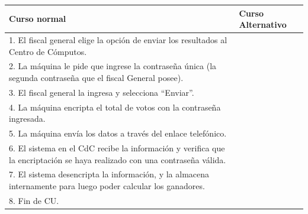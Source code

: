 \begin{table}[h!]
	
 \begin{tabular}{|p{7.5cm} | p{7.5cm}|} 
 \hline
 \textbf{Curso normal} & \textbf{Curso Alternativo} \\
 \hline

1. El fiscal general elige la opción de enviar los resultados al Centro de Cómputos.  & \\
\hline

2. La máquina le pide que ingrese la contraseña única (la segunda contraseña que el fiscal General posee). & \\
\hline

3. El fiscal general la ingresa y selecciona “Enviar”. & \\
\hline

4. La máquina encripta el total de votos con la contraseña ingresada. & \\
\hline

5. La máquina envía los datos a través del enlace telefónico. & \\
\hline

6. El sistema en el CdC recibe la información y verifica que la encriptación se haya realizado con una contraseña válida. & \\
\hline

7. El sistema desencripta la información, y la almacena internamente para luego poder calcular los ganadores. & \\

\hline

8. Fin de CU. & \\
\hline
\end{tabular}
\end{table}
